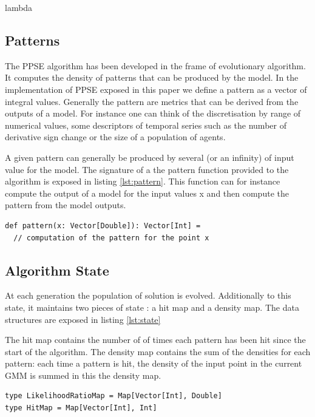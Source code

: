 \documentclass[10pt,letterpaper]{article}
\theoremstyle{definition}
\theoremstyle{remark}
\begin{document}
lambda

\subsection*{Patterns}

The PPSE algorithm has been developed in the frame of evolutionary algorithm. It computes the density of patterns that can be produced by the model. In the implementation of PPSE exposed in this paper we define a pattern as a vector of integral values. Generally the pattern are metrics that can be derived from the outputs of a model. For instance one can think of the discretisation by range of numerical values, some descriptors of temporal series such as the number of derivative sign change or the size of a population of agents. 

A given pattern can generally be produced by several (or an infinity) of input value for the model. The signature of a the pattern function provided to the algorithm is exposed in listing \ref{lst:pattern}. This function can for instance compute the output of a model for the input values x and then compute the pattern from the model outputs.

\begin{lstlisting}[caption={Pattern function},label={lst:patternFunction}]
def pattern(x: Vector[Double]): Vector[Int] = 
  // computation of the pattern for the point x
\end{lstlisting}


\subsection*{Algorithm State}\label{sec:algoState}

At each generation the population of solution is evolved. Additionally to this state, it maintains two pieces of state : a hit map and a density map. The data structures are exposed in listing \ref{lst:state}

The hit map contains the number of of times each pattern has been hit since the start of the algorithm. The density map contains the sum of the densities for each pattern: each time a pattern is hit, the density of the input point in the current GMM is summed in this the density map. 

\begin{lstlisting}[caption={State},label={lst:state}]
type LikelihoodRatioMap = Map[Vector[Int], Double]
type HitMap = Map[Vector[Int], Int]
\end{lstlisting}
\end{document}
